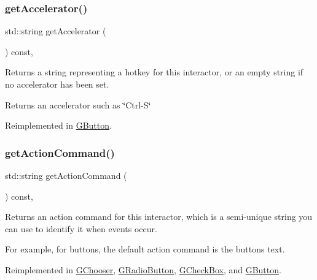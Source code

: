 \subsubsection{\texorpdfstring{get\+Accelerator()}{getAccelerator()}}
{\footnotesize\ttfamily std\+::string get\+Accelerator (\begin{DoxyParamCaption}{ }\end{DoxyParamCaption}) const\hspace{0.3cm}{\ttfamily [virtual]}, {\ttfamily [inherited]}}



Returns a string representing a hotkey for this interactor, or an empty string if no accelerator has been set. 

\begin{DoxyReturn}{Returns}
an accelerator such as \char`\"{}\+Ctrl-\/\+S\char`\"{} 
\end{DoxyReturn}


Reimplemented in \mbox{\hyperlink{classGButton_a432ca43c59ffb2adc9cb66d43621bc27}{G\+Button}}.

\mbox{\label{classGInteractor_a94eb4276000c4fdfb508ce9e6317a82a}} 
\subsubsection{\texorpdfstring{get\+Action\+Command()}{getActionCommand()}}
{\footnotesize\ttfamily std\+::string get\+Action\+Command (\begin{DoxyParamCaption}{ }\end{DoxyParamCaption}) const\hspace{0.3cm}{\ttfamily [virtual]}, {\ttfamily [inherited]}}



Returns an action command for this interactor, which is a semi-\/unique string you can use to identify it when events occur. 

For example, for buttons, the default action command is the button\textquotesingle{}s text. 

Reimplemented in \mbox{\hyperlink{classGChooser_a90f2b1e6f6e7dabd9d6e5307f7c6d1b7}{G\+Chooser}}, \mbox{\hyperlink{classGRadioButton_a90f2b1e6f6e7dabd9d6e5307f7c6d1b7}{G\+Radio\+Button}}, \mbox{\hyperlink{classGCheckBox_a90f2b1e6f6e7dabd9d6e5307f7c6d1b7}{G\+Check\+Box}}, and \mbox{\hyperlink{classGButton_a90f2b1e6f6e7dabd9d6e5307f7c6d1b7}{G\+Button}}.

